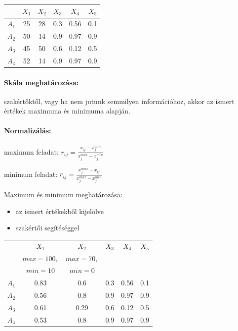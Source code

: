 \documentclass[a4paper,12pt]{article}
\begin{document}
\begin{center}
\begin{tabular}{c||c|c|c|c|c}
 & $X_1$& $X_2$& $X_3$& $X_4$& $X_5$ \\
 \hline
 $A_1$&25  &28 & 0.3 & 0.56 & 0.1 \\
 $A_2$&50  &14 & 0.9 & 0.97& 0.9 \\
 $A_3$&45  &50 & 0.6 & 0.12& 0.5 \\
 $A_4$&52  &14 & 0.9 & 0.97& 0.9 \\

\end{tabular}
\end{center}

\paragraph{Skála meghatározása:} szakértőktől, vagy ha nem jutunk semmilyen információhoz, akkor az ismert értékek maximuma és minimuma alapján.

\paragraph{Normalizálás:} 
\begin{center}
maximum feladat: $r_{ij} = \frac{x_{ij} - x^{min}_j}{x^{max}_j - x^{min}_j} $ 

minimum feladat: $r_{ij} = \frac{x^{max}_j - x_{ij}}{x^{max}_j - x^{min}_j} $
\end{center}
Maximum és minimum meghatározása:
\vspace{-0.2cm}
\begin{itemize}
\item az ismert értékekből kijelölve
\vspace{-0.3cm}
\item szakértői segítéséggel
\end{itemize}

\begin{center}
\begin{tabular}{c||c|c|c|c|c}
 & $X_1$& $X_2$& $X_3$& $X_4$& $X_5$ \\
  &\small{$max=100,$}&\small{$max=70,$}	&		&		&	\\
 &\small{$min=10$}&\small{$min=0$}	&		&		& \\
 \hline
 $A_1$&0.83  &0.6 &  0.3 & 0.56 & 0.1 \\
 $A_2$&0.56  &0.8 & 0.9 & 0.97 & 0.9 \\
 $A_3$&0.61  &0.29 & 0.6 & 0.12 & 0.5 \\
 $A_4$&0.53  &0.8 & 0.9 & 0.97 & 0.9 \\
\end{tabular}
\end{center}
\end{document}
